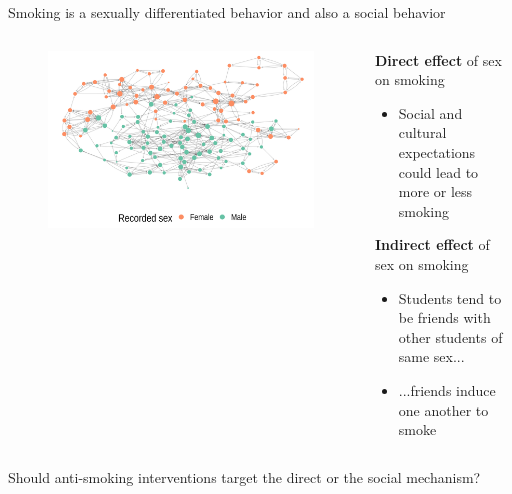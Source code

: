 \documentclass[aspectratio=169]{beamer}
\theoremstyle{remark}
\begin{document}
\begin{frame}{Smoking is a sexually differentiated behavior and also a social behavior}
    \begin{columns}
        \centering
        \begin{column}{0.55\textwidth}
            \begin{figure}
                \centering
                \includegraphics[width=1.05\textwidth]{figures/glasgow/sex.png}
            \end{figure}
        \end{column}
        \begin{column}{0.5\textwidth}
            \textbf{Direct effect} of sex on smoking
            \begin{itemize}
                \item Social and cultural expectations could lead to more or less smoking
            \end{itemize}
            \vspace{2mm}
            \textbf{Indirect effect} of sex on smoking
            \begin{itemize}
                \item Students tend to be friends with other students of same sex...
                \item ...friends induce one another to smoke
            \end{itemize}
        \end{column}
    \end{columns}
    \vspace{2mm}
    \pause
    \centering
    Should anti-smoking interventions target the direct or the social mechanism?
\end{frame}
\end{document}
